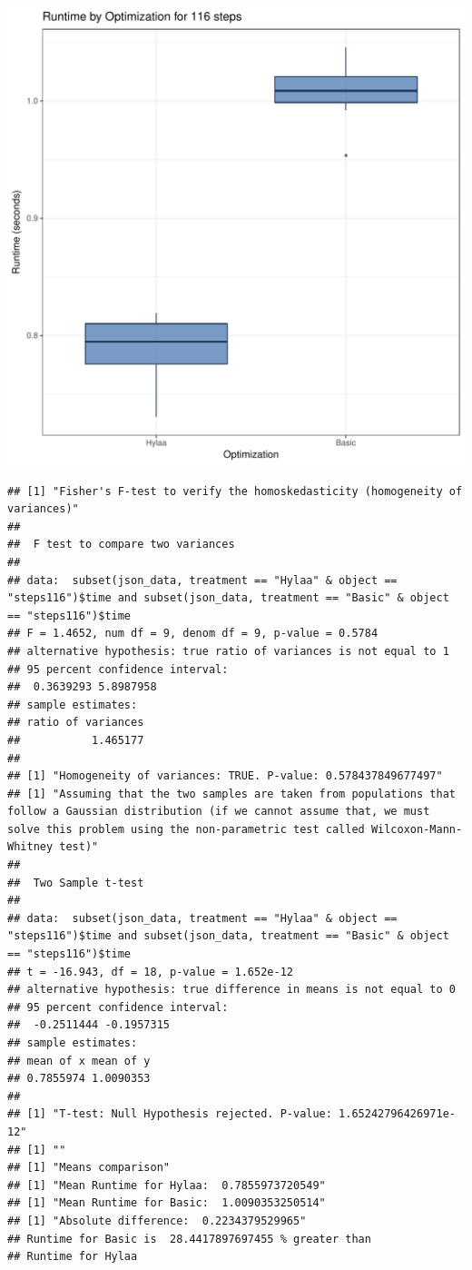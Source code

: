 \documentclass{article}\usepackage[]{graphicx}\usepackage[]{color}
\makeatletter
\def\maxwidth{ %
  \ifdim\Gin@nat@width>\linewidth
    \linewidth
  \else
    \Gin@nat@width
  \fi
}
\newenvironment{kframe}{%
 \def\at@end@of@kframe{}%
 \ifinner\ifhmode%
  \def\at@end@of@kframe{\end{minipage}}%
  \begin{minipage}{\columnwidth}%
 \fi\fi%
 \def\FrameCommand##1{\hskip\@totalleftmargin \hskip-\fboxsep
 \colorbox{shadecolor}{##1}\hskip-\fboxsep
     \hskip-\linewidth \hskip-\@totalleftmargin \hskip\columnwidth}%
 \MakeFramed {\advance\hsize-\width
   \@totalleftmargin\z@ \linewidth\hsize
   \@setminipage}}%
 {\par\unskip\endMakeFramed%
 \at@end@of@kframe}
\newenvironment{knitrout}{}{} %
\makeatother
\begin{document}
\begin{knitrout}
\color{fgcolor}
\includegraphics[width=\maxwidth]{figure/RH3_steps116-1} 
\begin{kframe}\begin{verbatim}
## [1] "Fisher's F-test to verify the homoskedasticity (homogeneity of variances)"
## 
## 	F test to compare two variances
## 
## data:  subset(json_data, treatment == "Hylaa" & object == "steps116")$time and subset(json_data, treatment == "Basic" & object == "steps116")$time
## F = 1.4652, num df = 9, denom df = 9, p-value = 0.5784
## alternative hypothesis: true ratio of variances is not equal to 1
## 95 percent confidence interval:
##  0.3639293 5.8987958
## sample estimates:
## ratio of variances 
##           1.465177 
## 
## [1] "Homogeneity of variances: TRUE. P-value: 0.578437849677497"
## [1] "Assuming that the two samples are taken from populations that follow a Gaussian distribution (if we cannot assume that, we must solve this problem using the non-parametric test called Wilcoxon-Mann-Whitney test)"
## 
## 	Two Sample t-test
## 
## data:  subset(json_data, treatment == "Hylaa" & object == "steps116")$time and subset(json_data, treatment == "Basic" & object == "steps116")$time
## t = -16.943, df = 18, p-value = 1.652e-12
## alternative hypothesis: true difference in means is not equal to 0
## 95 percent confidence interval:
##  -0.2511444 -0.1957315
## sample estimates:
## mean of x mean of y 
## 0.7855974 1.0090353 
## 
## [1] "T-test: Null Hypothesis rejected. P-value: 1.65242796426971e-12"
## [1] ""
## [1] "Means comparison"
## [1] "Mean Runtime for Hylaa:  0.7855973720549"
## [1] "Mean Runtime for Basic:  1.0090353250514"
## [1] "Absolute difference:  0.2234379529965"
## Runtime for Basic is  28.4417897697455 % greater than 
## Runtime for Hylaa
\end{verbatim}
\end{kframe}
\end{knitrout}
\end{document}
